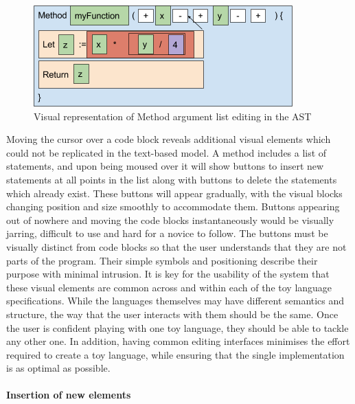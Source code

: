 \begin{figure}[H]
\centering
\includegraphics[scale=0.5]{graphics/astarg1} %
\caption{Visual representation of Method argument list editing in the AST}
\label{fig:astarg1} %
\end{figure}

Moving the cursor over a code block reveals additional visual elements which could not be replicated in the text-based model. A method includes a list of statements, and upon being moused over it will show buttons to insert new statements at all points in the list along with buttons to delete the statements which already exist. These buttons will appear gradually, with the visual blocks changing position and size smoothly to accommodate them. Buttons appearing out of nowhere and moving the code blocks instantaneously would be visually jarring, difficult to use and hard for a novice to follow. The buttons must be visually distinct from code blocks so that the user understands that they are not parts of the program. Their simple symbols and positioning describe their purpose with minimal intrusion. It is key for the usability of the system that these visual elements are common across and within each of the toy language specifications. While the languages themselves may have different semantics and structure, the way that the user interacts with them should be the same. Once the user is confident playing with one toy language, they should be able to tackle any other one. In addition, having common editing interfaces minimises the effort required to create a toy language, while ensuring that the single implementation is as optimal as possible.

\paragraph{Insertion of new elements}

